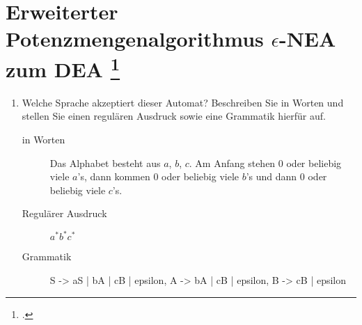 \documentclass{lehramt-informatik-aufgabe}
\begin{document}
\section{Erweiterter Potenzmengenalgorithmus $\epsilon$-NEA zum DEA
\footcite[Seite 47-49]{theo:fs:1}}

\begin{center}
\end{center}

\begin{enumerate}
\item Welche Sprache akzeptiert dieser Automat? Beschreiben Sie in
Worten und stellen Sie einen regulären Ausdruck sowie eine Grammatik
hierfür auf.

\begin{liAntwort}
\begin{description}
\item[in Worten]

Das Alphabet besteht aus $a$, $b$, $c$. Am Anfang stehen $0$ oder
beliebig viele $a$’s, dann kommen $0$ oder beliebig viele $b$’s und dann
$0$ oder beliebig viele $c$’s.

\item[Regulärer Ausdruck]

$a^*b^*c^*$

\item[Grammatik]

\begin{liProduktionsRegeln}
S -> aS | bA | cB | epsilon,
A -> bA | cB | epsilon,
B -> cB | epsilon
\end{liProduktionsRegeln}
\end{description}
\end{liAntwort}
\end{enumerate}
\end{document}
